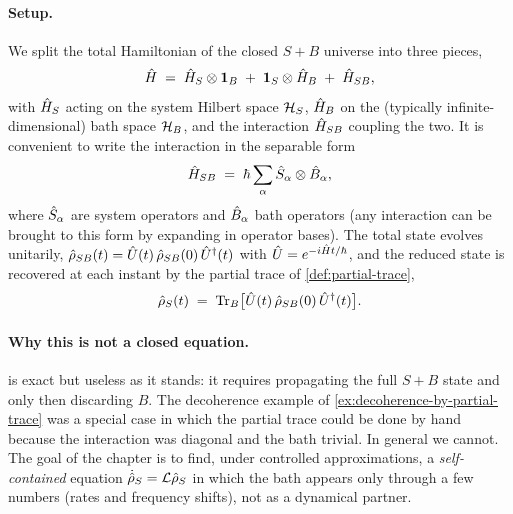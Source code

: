 \paragraph{Setup.}
We split the total Hamiltonian of the closed $S+B$ universe into
three pieces,
\begin{equation}
\label{eq:sb-hamiltonian}
\hat{H} \;=\; \hat{H}_S \otimes \mathbf{1}_B \;+\; \mathbf{1}_S \otimes \hat{H}_B
\;+\; \hat{H}_{SB},
\end{equation}
with $\hat{H}_S$ acting on the system Hilbert space $\mathcal{H}_S$,
$\hat{H}_B$ on the (typically infinite-dimensional) bath space
$\mathcal{H}_B$, and the interaction $\hat{H}_{SB}$ coupling the two. It
is convenient to write the interaction in the separable form
\begin{equation}
\label{eq:sb-interaction}
\hat{H}_{SB} \;=\; \hbar\sum_\alpha \hat{S}_\alpha \otimes \hat{B}_\alpha,
\end{equation}
where $\hat{S}_\alpha$ are system operators and $\hat{B}_\alpha$ bath
operators (any interaction can be brought to this form by expanding
in operator bases). The total state evolves unitarily,
$\hat{\rho}_{SB}(t)=\hat{U}(t)\,\hat{\rho}_{SB}(0)\,\hat{U}^\dagger(t)$ with
$\hat{U}=e^{-i\hat{H} t/\hbar}$, and the reduced state is recovered at
each instant by the partial trace of \cref{def:partial-trace},
\begin{equation}
\label{eq:reduced-state}
\hat{\rho}_S(t) \;=\; \operatorname{Tr}_B\bigl[\hat{U}(t)\,\hat{\rho}_{SB}(0)\,\hat{U}^\dagger(t)\bigr].
\end{equation}

\paragraph{Why this is not a closed equation.}
 is exact but useless as it stands: it
requires propagating the full $S+B$ state and only then discarding
$B$. The decoherence example of
\cref{ex:decoherence-by-partial-trace} was a special case in which
the partial trace could be done by hand because the interaction was
diagonal and the bath trivial. In general we cannot. The goal of
the chapter is to find, under controlled approximations, a
\emph{self-contained} equation $\dot{\hat{\rho}}_S=\mathcal L\hat{\rho}_S$
in which the bath appears only through a few numbers (rates and
frequency shifts), not as a dynamical partner.

